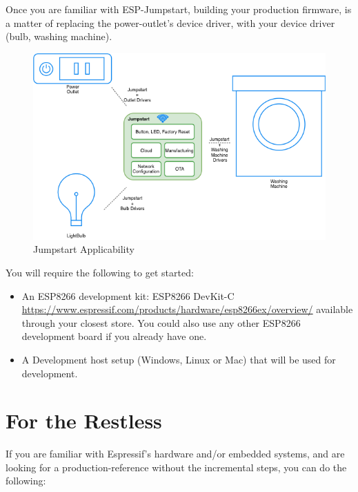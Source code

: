 \documentclass[main.tex]{subfiles}
\begin{document}
Once you are familiar with ESP-Jumpstart, building your production firmware, is a matter of replacing the power-outlet's device driver, with your device driver (bulb, washing machine).

\begin{figure}[h!]
    \centering
    \includegraphics[scale=0.7]{../../_static/jumpstart-outlet-blocks.png}
    \caption{Jumpstart Applicability}
    \label{fig:jumpstart_applicability}
\end{figure}

You will require the following to get started:
\begin{itemize}
\item An ESP8266 development kit: ESP8266 DevKit-C \url{https://www.espressif.com/products/hardware/esp8266ex/overview/} available through your closest store. You could also use any other ESP8266 development board if you already have one.
\item A Development host setup (Windows, Linux or Mac) that will be used for development.
\end{itemize}

\section{For the Restless}
If you are familiar with Espressif's hardware and/or embedded systems, and are looking for a production-reference without the incremental steps, you can do the following: 
\end{document}
